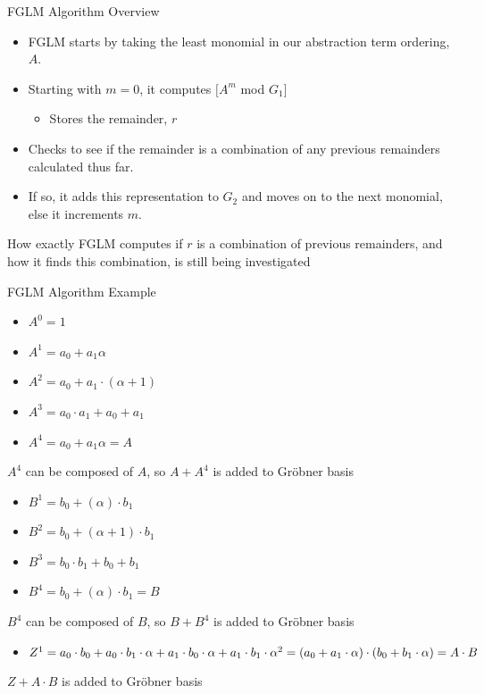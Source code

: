 \documentclass[xcolor=dvipsnames]{beamer}
\newcommand{\Grobner}{Gr\"{o}bner\xspace}
\begin{document}

\begin{frame}{\large {FGLM Algorithm Overview}}
\begin{itemize}
\item FGLM starts by taking the least monomial in our abstraction term 
ordering, $A$.
\item Starting with $m=0$, it computes $[A^m$ mod $G_1]$
	\begin{itemize}
	\item Stores the remainder, $r$
	\end{itemize} 
\item Checks to see if the remainder is a combination of any previous remainders calculated thus far.
\item If so, it adds this 
representation to $G_2$ and moves on to the next monomial, else it 
increments $m$.
\end{itemize}

How exactly FGLM computes if $r$ is a combination of previous remainders, and how it finds this combination, is still being investigated
\end{frame}


\begin{frame}{\large {FGLM Algorithm Example}}
\begin{itemize}
\item $A^0 = 1$
\item $A^1 = a_0+ a_1 \alpha$
\item $A^2 = a_0+a_1 \cdot (\alpha+1) $
\item $A^3 = a_0 \cdot a_1+a_0+a_1$
\item $A^4 = a_0+ a_1 \alpha = A$
\end{itemize}

$A^4$ can be composed of $A$, so $A + A^4$ is added to \Grobner basis 

\begin{itemize}
\item $B^1 = b_0+(\alpha) \cdot b_1$
\item $B^2 = b_0+(\alpha+1) \cdot b_1$
\item $B^3 = b_0 \cdot b_1+b_0+b_1$
\item $B^4 = b_0+(\alpha) \cdot b_1 = B$
\end{itemize}

$B^4$ can be composed of $B$, so $B + B^4$ is added to \Grobner basis

\begin{itemize}
\item $Z^1 = a_0 \cdot b_0 + a_0 \cdot b_1 \cdot \alpha + a_1 \cdot b_0 \cdot \alpha + a_1 \cdot b_1 \cdot \alpha^2 \linebreak
= (a_0 + a_1 \cdot \alpha) \cdot (b_0 + b_1 \cdot \alpha) = A \cdot B$
\end{itemize}

$Z + A \cdot B$ is added to \Grobner basis

\end{frame}
\end{document}
